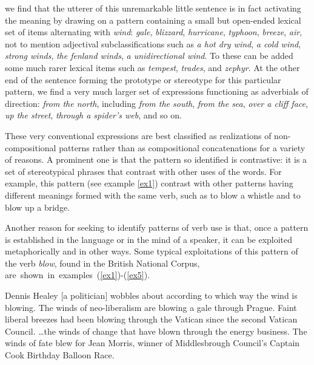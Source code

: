 \documentclass[output=paper]{langsci/langscibook}
\begin{document}
\noindent we find that the utterer of this unremarkable little sentence is in fact
activating the meaning by drawing on a pattern containing a small but
open-ended lexical set of items alternating with \textit{wind}: \textit{gale},
\textit{blizzard}, \textit{hurricane}, \textit{typhoon}, \textit{breeze}, \textit{air}, not to mention adjectival
subclassifications such as \textit{a hot dry wind}, \textit{a cold wind}, \textit{strong winds},
\textit{the fenland winds}, \textit{a unidirectional wind}. To these can be added some
much rarer lexical items such as \textit{tempest}, \textit{trades}, and \textit{zephyr}. At the
other end of the sentence forming the prototype or stereotype for this
particular pattern, we find a very much larger set of expressions
functioning as adverbials of direction: \textit{from the north}, including
\textit{from the south}, \textit{from the sea}, \textit{over a cliff face}, \textit{up the street}, \textit{through
a spider’s web}, and so on. 



These very conventional expressions are best classified as realizations
of non-compositional patterns rather than as compositional
concatenations for a variety of reasons. A prominent one is that the
pattern so identified is contrastive: it is a set of stereotypical
phrases that contrast with other uses of the words. For example, this
pattern (see example \ref{ex1}) contrast with other patterns having different
meanings formed with the same verb, such as to blow a whistle and to
blow up a bridge. 



Another reason for seeking to identify patterns of verb use is that,
once a pattern is established in the language or in the mind of a
speaker, it can be exploited metaphorically and in other ways. Some
typical exploitations of this pattern of the verb \textit{blow}, found in the
British National Corpus, \mbox{are shown in examples (\ref{ex1})-(\ref{ex5})}.



\ea
\label{ex1}
 Dennis Healey $[$a politician$]$ wobbles about according to which way
the wind is blowing. 
\ex \label{ex2}
The winds of neo-liberalism are blowing a gale through Prague.
\ex \label{ex3} 
Faint liberal breezes had been blowing through the Vatican since the
second Vatican Council.
\ex \label{ex4}  
\ldots the winds of change that have blown through the energy business.
\ex \label{ex5} 
The winds of fate blew for Jean Morris, winner of Middlesbrough
Council's Captain Cook Birthday Balloon Race.
\z
\end{document}
